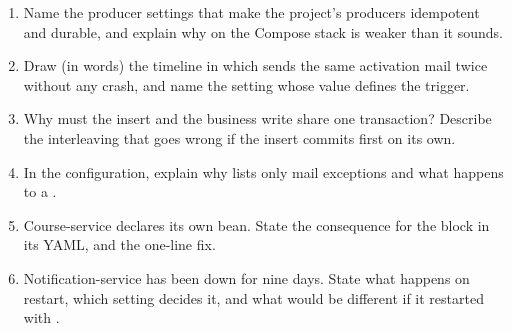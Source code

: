 \begin{quiz}
\begin{enumerate}
  \item Name the producer settings that make the project's producers
  idempotent and durable, and explain why  on the Compose
  stack is weaker than it sounds.
  \item Draw (in words) the timeline in which 
  sends the same activation mail twice without any crash, and name the
  setting whose value defines the trigger.
  \item Why must the  insert and the business
  write share one transaction? Describe the interleaving that goes
  wrong if the insert commits first on its own.
  \item In the  configuration, explain why
   lists only mail exceptions and what happens to a
  .
  \item Course-service declares its own  bean.
  State the consequence for the  block in
  its YAML, and the one-line fix.
  \item Notification-service has been down for nine days. State what
  happens on restart, which setting decides it, and what would be
  different if it restarted with .
\end{enumerate}
\end{quiz}
